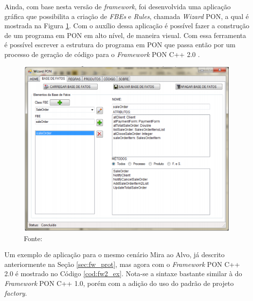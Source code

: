 Ainda, com base nesta versão de \textit{framework}, foi desenvolvida uma aplicação
gráfica que possibilita a criação de \textit{FBEs} e \textit{Rules}, chamada
\textit{Wizard} PON, a qual é mostrada na Figura \ref{fig:wizard}. Com o auxílio
dessa aplicação é possível fazer a construção de um programa em PON em alto
nível, de maneira visual. Com essa ferramenta é possível escrever a estrutura do
programa em PON que passa então por um processo de geração de código para o
\textit{Framework} PON C++ 2.0 \cite{msc_valenca_2012}.

\begin{figure}[!htb]
  \centering
  \includegraphics[width=.9\textwidth]{../figures/wizard.png}
  \caption{\textit{Wizard} PON} \caption*{Fonte: }
  \label{fig:wizard}
\end{figure}

Um exemplo de aplicação para o mesmo cenário Mira ao Alvo, já descrito
anteriormente na Seção \ref{sec:fw_prot}, mas agora com o \textit{Framework} PON
C++ 2.0 é mostrado no Código \ref{cod:fw2_ex}. Nota-se a sintaxe bastante
similar à do \textit{Framework} PON C++ 1.0, porém com a adição do uso do padrão
de projeto \textit{factory}. 

